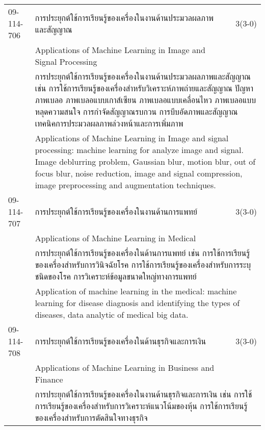 \begin{longtable}{p{}p{}r{}}
09-114-706 & การประยุกต์ใช้การเรียนรู้ของเครื่องในงานด้านประมวลผลภาพและสัญญาณ & 3(3-0)\\*
 & Applications of Machine Learning in Image and Signal Processing & \phantom{x} \vspace{3mm} \\*
&  \multicolumn{2}{p{0.75\textwidth}}{การประยุกต์ใช้การเรียนรู้ของเครื่องในงานด้านประมวลผลภาพและสัญญาณ เช่น การใช้การเรียนรู้ของเครื่องสำหรับวิเคราะห์ภาพถ่ายและสัญญาณ ปัญหาภาพเบลอ ภาพเบลอแบบเกาส์เซียน ภาพเบลอแบบเคลื่อนไหว ภาพเบลอแบบหลุดความสนใจ การกำจัดสัญญาณรบกวน การบีบอัดภาพและสัญญาณ เทคนิคการประมวลผลภาพล่วงหน้าและการเพิ่มภาพ } \vspace{3mm} \\*
&  \multicolumn{2}{p{0.75\textwidth}}{Applications of Machine Learning in Image and signal processing: machine learning for analyze image and signal. Image deblurring problem, Gaussian blur, motion blur, out of focus blur, noise reduction, image and signal compression, image preprocessing and augmentation techniques.} \vspace{8mm} \\*
09-114-707 & การประยุกต์ใช้การเรียนรู้ของเครื่องในงานด้านการแพทย์  & 3(3-0)\\*
 & Applications of Machine Learning in Medical & \phantom{x} \vspace{3mm} \\*
&  \multicolumn{2}{p{0.75\textwidth}}{การประยุกต์ใช้การเรียนรู้ของเครื่องในด้านการแพทย์ เช่น การใช้การเรียนรู้ของเครื่องสำหรับการวินิจฉัยโรค การใช้การเรียนรู้ของเครื่องสำหรับการระบุชนิดของโรค การวิเคราะห์ข้อมูลขนาดใหญ่ทางการแพทย์} \vspace{3mm} \\*
&  \multicolumn{2}{p{0.75\textwidth}}{Application of machine learning in the medical: machine learning for disease diagnosis and identifying the types of diseases, data analytic of medical big data.} \vspace{8mm} \\*
09-114-708 & การประยุกต์ใช้การเรียนรู้ของเครื่องในด้านธุรกิจและการเงิน & 3(3-0)\\*
 & Applications of Machine Learning in Business and Finance & \phantom{x} \vspace{3mm} \\*
&  \multicolumn{2}{p{0.75\textwidth}}{การประยุกต์ใช้การเรียนรู้ของเครื่องในงานด้านธุรกิจและการเงิน เช่น การใช้การเรียนรู้ของเครื่องสำหรับการวิเคราะห์แนวโน้มของหุ้น การใช้การเรียนรู้ของเครื่องสำหรับการตัดสินใจทางธุรกิจ} \vspace{3mm} \\*

\end{longtable}
